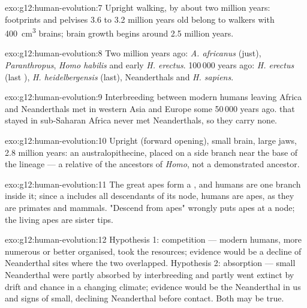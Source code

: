 \begin{solution}{exo:g12:human-evolution:7}
Upright walking, by about two million years: footprints and pelvises
3.6 to 3.2 million years old belong to walkers with \qty{400}{cm^3}
brains; brain growth begins around 2.5 million years.
\end{solution}

\begin{solution}{exo:g12:human-evolution:8}
Two million years ago: \emph{A. africanus} (just), \emph{Paranthropus},
\emph{Homo habilis} and early \emph{H. erectus}. 100\,000 years ago:
\emph{H. erectus} (last ), \emph{H. heidelbergensis} (last),
Neanderthals and \emph{H. sapiens}.
\end{solution}

\begin{solution}{exo:g12:human-evolution:9}
Interbreeding between modern humans leaving Africa and Neanderthals
met in western Asia and Europe some 50\,000 years ago. 
that stayed in sub-Saharan Africa never met Neanderthals, so they
carry none.
\end{solution}

\begin{solution}{exo:g12:human-evolution:10}
Upright (forward opening), small brain, large jaws, 2.8 million years:
an australopithecine, placed on a side branch near the base of the
lineage --- a relative of the ancestors of \emph{Homo}, not a
demonstrated ancestor.
\end{solution}

\begin{solution}{exo:g12:human-evolution:11}
The great apes form a , and humans are one branch inside it;
since a  includes all descendants of its node, humans are apes,
as they are primates and mammals. "Descend from apes" wrongly puts
apes at a node; the living apes are sister tips.
\end{solution}

\begin{solution}{exo:g12:human-evolution:12}
Hypothesis 1: competition --- modern humans, more numerous or better
organised, took the resources; evidence would be a decline of
Neanderthal sites where the two overlapped. Hypothesis 2: absorption
--- small Neanderthal  were partly absorbed by interbreeding
and partly went extinct by drift and chance in a changing climate;
evidence would be the Neanderthal  in us and signs of small,
declining Neanderthal  before contact. Both may be true.
\end{solution}

